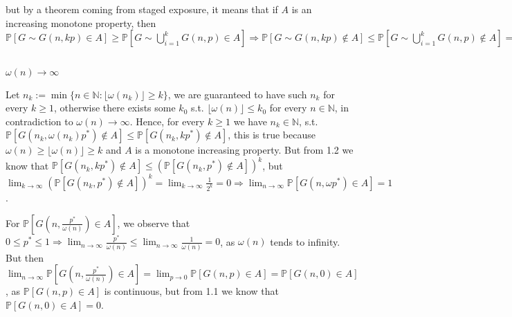\documentclass{article}
\begin{document}
but by a theorem coming from staged exposure, it means that if $A$ is an increasing monotone property, then $\mathbb{P}[G\sim{G(n,kp)}\in{A}]\geq{\mathbb{P}[G\sim\bigcup_{i=1}^{k}G(n,p)\in{A}]}\Rightarrow{\mathbb{P}[G\sim{G(n,kp)}\notin{A}]\leq{\mathbb{P}[G\sim\bigcup_{i=1}^{k}G(n,p)\notin{A}]}=(\mathbb{P}[G\sim{G(n,p)}\notin{A}]})^k$

\subsection{}
$\omega(n)\rightarrow{\infty}$

Let $n_k:=\min\{n\in\mathbb{N} : \lfloor\omega(n_k)\rfloor\geq{k}\}$, we are guaranteed to have such $n_k$ for every $k\geq{1}$, otherwise there exists some $k_0$ s.t. $\lfloor\omega(n)\rfloor\leq{k_0}$ for every $n\in\mathbb{N}$, in contradiction to $\omega(n)\rightarrow\infty$. 
Hence, for every $k\geq{1}$ we have $n_k\in\mathbb{N}$, s.t. $\mathbb{P}[G(n_k,\omega(n_k)p^{\ast})\notin{A}]\leq{\mathbb{P}[G(n_k,kp^{\ast})\notin{A}]}$, this is true because $\omega(n)\geq\lfloor\omega(n)\rfloor\geq{k}$ and $A$ is a monotone increasing property. But from 1.2 we know that $\mathbb{P}[G(n_k,kp^{\ast})\notin{A}]\leq{(\mathbb{P}[G(n_k,p^{\ast})\notin{A}])^k}$, but $\lim_{k\rightarrow\infty}(\mathbb{P}[G(n_k,p^{\ast})\notin{A}])^k=\lim_{k\rightarrow\infty}\frac{1}{2^k}=0\Rightarrow{\lim_{n\rightarrow\infty}\mathbb{P}[G(n,\omega{p^{\ast}})\in{A}]}=1$.

For $\mathbb{P}[G(n,\frac{p^{\ast}}{\omega(n)})\in{A}]$, we observe that $0\leq{p^{\ast}}\leq{1}\Rightarrow{\lim_{n\rightarrow\infty}\frac{p^{\ast}}{\omega(n)}}\leq{\lim_{n\rightarrow\infty}\frac{1}{\omega(n)}}=0$, as $\omega(n)$ tends to infinity.
But then $\lim_{n\rightarrow\infty}\mathbb{P}[G(n,\frac{p^{\ast}}{\omega(n)})\in{A}]=\lim_{p\rightarrow{0}}\mathbb{P}[G(n,p)\in{A}]=\mathbb{P}[G(n,0)\in{A}]$, as $\mathbb{P}[G(n,p)\in{A}]$ is continuous, but from 1.1 we know that $\mathbb{P}[G(n,0)\in{A}]=0$.
\end{document}
